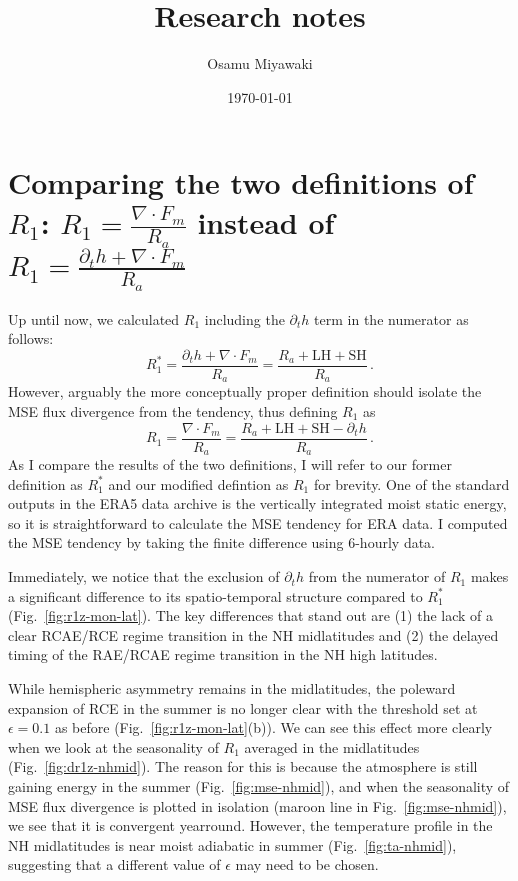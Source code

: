 \documentclass{article}
\title{Research notes}
\date{\today}
\author{Osamu Miyawaki}
\begin{document}
\maketitle

\section{Comparing the two definitions of $R_1$: $R_1=\frac{\nabla\cdot F_m}{R_a}$ instead of $R_1=\frac{\partial_t h+\nabla\cdot F_m}{R_a}$}
Up until now, we calculated $R_1$ including the $\partial_t h$ term in the numerator as follows:
\begin{equation}
R_1^* = \frac{\partial_t h + \nabla\cdot F_m}{R_a} = \frac{R_a + \mathrm{LH + SH}}{R_a} \, .
\end{equation}
However, arguably the more conceptually proper definition should isolate the MSE flux divergence from the tendency, thus defining $R_1$ as
\begin{equation}
R_1 = \frac{\nabla\cdot F_m}{R_a} = \frac{R_a + \mathrm{LH + SH}-\partial_t h}{R_a} \, .
\end{equation}
As I compare the results of the two definitions, I will refer to our former definition as $R_1^*$ and our modified defintion as $R_1$ for brevity. One of the standard outputs in the ERA5 data archive is the vertically integrated moist static energy, so it is straightforward to calculate the MSE tendency for ERA data. I computed the MSE tendency by taking the finite difference using 6-hourly data.

Immediately, we notice that the exclusion of $\partial_t h$ from the numerator of $R_1$ makes a significant difference to its spatio-temporal structure compared to $R_1^*$ (Fig.~\ref{fig:r1z-mon-lat}). The key differences that stand out are (1) the lack of a clear RCAE/RCE regime transition in the NH midlatitudes and (2) the delayed timing of the RAE/RCAE regime transition in the NH high latitudes.

While hemispheric asymmetry remains in the midlatitudes, the poleward expansion of RCE in the summer is no longer clear with the threshold set at $\epsilon=0.1$ as before (Fig.~\ref{fig:r1z-mon-lat}(b)). We can see this effect more clearly when we look at the seasonality of $R_1$ averaged in the midlatitudes (Fig.~\ref{fig:dr1z-nhmid}). The reason for this is because the atmosphere is still gaining energy in the summer (Fig.~\ref{fig:mse-nhmid}), and when the seasonality of MSE flux divergence is plotted in isolation (maroon line in Fig.~\ref{fig:mse-nhmid}), we see that it is convergent yearround. However, the temperature profile in the NH midlatitudes is near moist adiabatic in summer (Fig.~\ref{fig:ta-nhmid}), suggesting that a different value of $\epsilon$ may need to be chosen.
\end{document}

